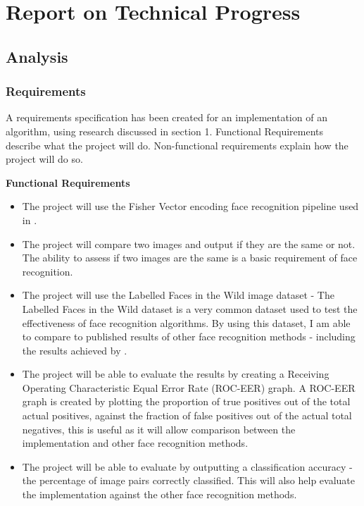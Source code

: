 \documentclass[12pt, a4paper]{article}
\begin{document}
\section{Report on Technical Progress}
\subsection{Analysis}
\subsubsection{Requirements}
A requirements specification has been created for an implementation of an algorithm, using research discussed in section 1. Functional Requirements describe what the project will do. Non-functional requirements explain how the project will do so.

\textbf{Functional Requirements}
\begin{itemize}
\item The project will use the Fisher Vector encoding face recognition pipeline used in \cite{simonyan2004fisher}.
\item The project will compare two images and output if they are the same or not. The ability to assess if two images are the same is a basic requirement of face recognition.
\item The project will use the Labelled Faces in the Wild image dataset - The Labelled Faces in the Wild dataset is a very common dataset used to test the effectiveness of face recognition algorithms. By using this dataset, I am able to compare to published results of other face recognition methods - including the results achieved by \cite{simonyan2004fisher}.
\item The project will be able to evaluate the results by creating a Receiving Operating Characteristic Equal Error Rate (ROC-EER) graph. A ROC-EER graph is created by plotting the proportion of true positives out of the total actual positives, against the fraction of false positives out of the actual total negatives, this is useful as it will allow comparison between the implementation and other face recognition methods.
\item The project will be able to evaluate by outputting a classification accuracy - the percentage of image pairs correctly classified. This will also help evaluate the implementation against the other face recognition methods.
\end{itemize}
\end{document}
